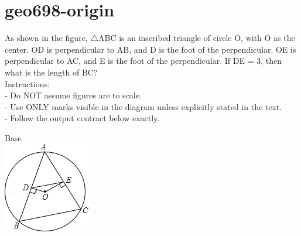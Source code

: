 \documentclass[12pt]{article}
\begin{document}
\section*{geo698-origin}
\noindent\begin{minipage}{\textwidth}
\setlength{\parskip}{4pt}
As shown in the figure, \ensuremath{\triangle }ABC is an inscribed triangle of circle O, with O as the center. OD is perpendicular to AB, and D is the foot of the perpendicular. OE is perpendicular to AC, and E is the foot of the perpendicular. If DE = 3, then what is the length of BC?\\
Instructions:\\
- Do NOT assume figures are to scale.\\
- Use ONLY marks visible in the diagram unless explicitly stated in the text.\\
- Follow the output contract below exactly.\\
\end{minipage}
\begin{center}
\begin{minipage}{0.32\textwidth}\centering
Base\\
\includegraphics[width=0.95\linewidth]{out_rommath_origin/items/geo698-origin/assets/figure.png}
\end{minipage}
\par
\end{center}
\bigskip
\end{document}
